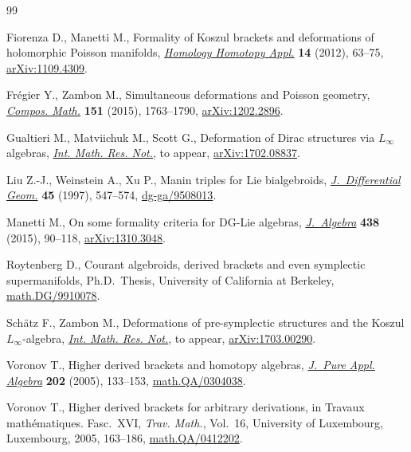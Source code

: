\documentclass[pdftex]{sigma}
\numberwithin{equation}{section}
\begin{document}
\begin{thebibliography}{99}
\footnotesize\itemsep=0pt

Fiorenza D., Manetti M., Formality of {K}oszul brackets and deformations of
 holomorphic {P}oisson manifolds, \href{https://doi.org/10.4310/HHA.2012.v14.n2.a4}{\textit{Homology Homotopy Appl.}} \textbf{14}
 (2012), 63--75, \href{https://arxiv.org/abs/1109.4309}{arXiv:1109.4309}.

Fr\'{e}gier Y., Zambon M., Simultaneous deformations and {P}oisson geometry,
 \href{https://doi.org/10.1112/S0010437X15007277}{\textit{Compos. Math.}} \textbf{151} (2015), 1763--1790, \href{https://arxiv.org/abs/1202.2896}{arXiv:1202.2896}.

Gualtieri M., Matviichuk M., Scott G., Deformation of {D}irac structures via
 {$L_{\infty}$} algebras, \href{https://doi.org/10.1093/imrn/rny134}{\textit{Int. Math. Res. Not.}}, {t}o appear,
 \href{https://arxiv.org/abs/1702.08837}{arXiv:1702.08837}.

Liu Z.-J., Weinstein A., Xu P., Manin triples for {L}ie bialgebroids,
 \href{https://doi.org/10.4310/jdg/1214459842}{\textit{J.~Differential Geom.}} \textbf{45} (1997), 547--574,
 \href{https://arxiv.org/abs/dg-ga/9508013}{dg-ga/9508013}.

Manetti M., On some formality criteria for {DG}-{L}ie algebras,
 \href{https://doi.org/10.1016/j.jalgebra.2015.04.029}{\textit{J.~Algebra}} \textbf{438} (2015), 90--118, \href{https://arxiv.org/abs/1310.3048}{arXiv:1310.3048}.

Roytenberg D., Courant algebroids, derived brackets and even symplectic
 supermanifolds, Ph.D.~Thesis, University of California at Berkeley,
 \href{https://arxiv.org/abs/math.DG/9910078}{math.DG/9910078}.

Sch\"atz F., Zambon M., Deformations of pre-symplectic structures and the
 {K}oszul {$L_{\infty}$}-algebra, \href{https://doi.org/10.1093/imrn/rny123}{\textit{Int. Math. Res. Not.}}, {t}o appear,
 \href{https://arxiv.org/abs/1703.00290}{arXiv:1703.00290}.

Voronov T., Higher derived brackets and homotopy algebras, \href{https://doi.org/10.1016/j.jpaa.2005.01.010}{\textit{J.~Pure
 Appl. Algebra}} \textbf{202} (2005), 133--153, \href{https://arxiv.org/abs/math.QA/0304038}{math.QA/0304038}.

Voronov T., Higher derived brackets for arbitrary derivations, in Travaux
 math\'{e}matiques. {F}asc.~{XVI}, \textit{Trav. Math.}, Vol.~16, University
 of Luxembourg, Luxembourg, 2005, 163--186, \href{https://arxiv.org/abs/math.QA/0412202}{math.QA/0412202}.

\end{thebibliography}\LastPageEnding
\end{document}

